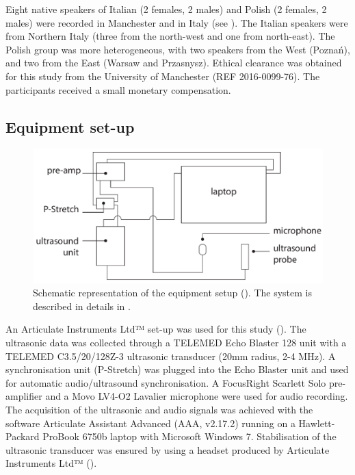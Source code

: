 \documentclass[authoryear, 5p]{elsarticle}
\begin{document}

Eight native speakers of Italian (2 females, 2 males) and Polish (2
females, 2 males) were recorded in Manchester and in Italy (see
). The Italian speakers were from Northern Italy
(three from the north-west and one from north-east). The Polish group
was more heterogeneous, with two speakers from the West (Poznań), and
two from the East (Warsaw and Przasnysz). Ethical clearance was obtained
for this study from the University of Manchester (REF 2016-0099-76). The
participants received a small monetary compensation.

\subsection{Equipment set-up}\label{equipment-set-up}

\label{s:equipment}

\begin{figure}
    \centering
    \includegraphics[width=.7\textwidth]{../../graphics/uti-setup.pdf}
    \caption{Schematic representation of the equipment setup (\citealt{articulate2011}). The system is described in details in .}
    \label{f:uti-setup}
\end{figure}

An Articulate Instruments Ltd™ set-up was used for this study
(). The ultrasonic data was collected through a
TELEMED Echo Blaster 128 unit with a TELEMED C3.5/20/128Z-3 ultrasonic
transducer (20mm radius, 2-4 MHz). A synchronisation unit (P-Stretch)
was plugged into the Echo Blaster unit and used for automatic
audio/ultrasound synchronisation. A FocusRight Scarlett Solo
pre-amplifier and a Movo LV4-O2 Lavalier microphone were used for audio
recording. The acquisition of the ultrasonic and audio signals was
achieved with the software Articulate Assistant Advanced (AAA, v2.17.2)
running on a Hawlett-Packard ProBook 6750b laptop with Microsoft Windows
7. Stabilisation of the ultrasonic transducer was ensured by using a
headset produced by Articulate Instruments Ltd™
(\citeyear{articulate2008}).
\end{document}
